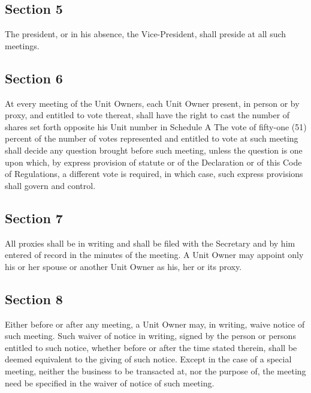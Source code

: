 \documentclass[
]{book}
\begin{document}
\hypertarget{section-5}{%
\subsection*{Section 5}\label{section-5}}

The president, or in his absence, the Vice-President, shall preside at all such meetings.

\hypertarget{section-6}{%
\subsection*{Section 6}\label{section-6}}

At every meeting of the Unit Owners, each Unit Owner present, in person or by proxy, and entitled to vote thereat, shall have the right to cast the number of shares set forth opposite his Unit number in Schedule A The vote of fifty-one (51) percent of the number of votes represented and entitled to vote at such meeting shall decide any question brought before such meeting, unless the question is one upon which, by express provision of statute or of the Declaration or of this Code of Regulations, a different vote is required, in which case, such express provisions shall govern and control.

\hypertarget{section-7}{%
\subsection*{Section 7}\label{section-7}}

All proxies shall be in writing and shall be filed with the Secretary and by him entered of record in the minutes of the meeting. A Unit Owner may appoint only his or her spouse or another Unit Owner as his, her or its proxy.

\hypertarget{section-8}{%
\subsection*{Section 8}\label{section-8}}

Either before or after any meeting, a Unit Owner may, in writing, waive notice of such meeting. Such waiver of notice in writing, signed by the person or persons entitled to such notice, whether before or after the time stated therein, shall be deemed equivalent to the giving of such notice. Except in the case of a special meeting, neither the business to be transacted at, nor the purpose of, the meeting need be specified in the waiver of notice of such meeting.
\end{document}
